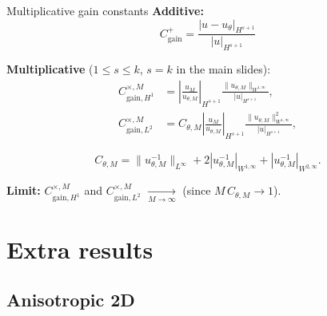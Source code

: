 \begin{frame}{Multiplicative gain constants}
	\textbf{Additive:}
	\vspace{-3pt}
	\[
		C_{\text{gain}}^{+}=\frac{| u-u_{\theta} |_{H^{s+1}}}{| u |_{H^{s+1}}}
	\]
	\vspace{-4pt}

	\textbf{Multiplicative} ($1\leqslant s\leqslant k$, $s=k$ in the main slides):
	\vspace{-3pt}
	\begin{align*}
		C_{\text{gain},H^1}^{\times,M} & = \left| \frac{u_M}{u_{\theta,M}} \right|_{H^{s+1}} \frac{\| u_{\theta,M}\|_{W^{1,\infty}}}{| u |_{H^{s+1}}}, \\
		C_{\text{gain},L^2}^{\times,M} & = C_{\theta,M}\left| \frac{u_M}{u_{\theta,M}} \right|_{H^{s+1}} \frac{\| u_{\theta,M}\|_{W^{1,\infty}}^2}{| u |_{H^{s+1}}},
	\end{align*}
	\vspace{-14pt}

	\[
		C_{\theta,M}=\|u_{\theta,M}^{-1}\|_{L^{\infty}}+2|u_{\theta,M}^{-1}|_{W^{1,\infty}}+|u_{\theta,M}^{-1}|_{W^{2,\infty}}.
	\]
	\vspace{-14pt}

	\textbf{Limit:} $C_{\text{gain},H^1}^{\times,M}$ and $C_{\text{gain},L^2}^{\times,M}$ $\underset{M\to\infty}{\longrightarrow}$  (since $M\,C_{\theta,M}\to 1$).
\end{frame}

\section{Extra results}

\subsection{Anisotropic 2D}

